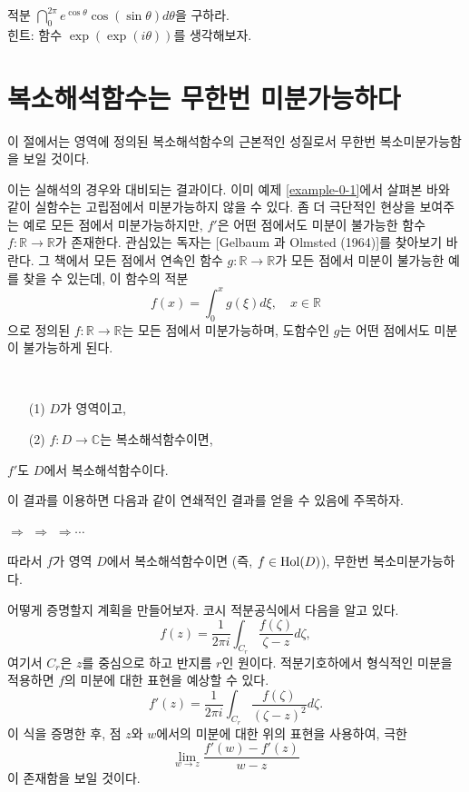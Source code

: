 \begin{salt_exercise} \label{ex-3-28}
적분 $\dint_0^{2\pi} e^{\cos \theta} \cos(\sin\theta)d\theta$을 구하라.\\[1ex]
힌트: 함수 $\exp(\exp(i\theta))$를 생각해보자.
\end{salt_exercise}

\section{복소해석함수는 무한번 미분가능하다}

이 절에서는 영역에 정의된 복소해석함수의 근본적인 성질로서 
무한번 복소미분가능함을 보일 것이다.

이는 실해석의 경우와 대비되는 결과이다.
이미 예제 \ref{example-0-1}에서 살펴본 바와 같이
실함수는 고립점에서 미분가능하지 않을 수 있다.
좀 더 극단적인 현상을 보여주는 예로 
모든 점에서 미분가능하지만, $f'$은 어떤 점에서도 미분이 불가능한 
함수 $f:\mathbb R\to \mathbb R$가 존재한다.
관심있는 독자는 [Gelbaum 과 Olmsted (1964)]를 %
 찾아보기 바란다.
그 책에서 모든 점에서 연속인 함수 $g:\mathbb R\to \mathbb R$가 
모든 점에서 미분이 불가능한 예를 찾을 수 있는데,
이 함수의 적분
\[
f(x) = \int_0^x g(\xi)d\xi, \quad x\in \mathbb R
\]
으로 정의된 $f:\mathbb R\to \mathbb R$는 모든 점에서 미분가능하며,
도함수인 $g$는 어떤 점에서도 미분이 불가능하게 된다.

\begin{salt_corollary} \label{coro-3-6}
\
\begin{itemize}
\item[(1)] $D$가 영역이고,
\item[(2)] $f:D\to\mathbb C$는 복소해석함수이면,
\end{itemize}
$f'$도 $D$에서 복소해석함수이다.
\end{salt_corollary}

이 결과를 이용하면 다음과 같이 연쇄적인 결과를 얻을 수 있음에 주목하자.

\begin{center}
 $\Rightarrow$ 
$\Rightarrow$
$\Rightarrow\cdots$
\end{center}

따라서 $f$가 영역  $D$에서 복소해석함수이면 (즉, $f\in \mathop{\mathrm{Hol}}(D)$),
무한번 복소미분가능하다.

어떻게 증명할지 계획을 만들어보자.
코시 적분공식에서 다음을 알고 있다.
\[
f(z) = \dfrac1{2\pi i} \int_{C_r} \dfrac{f(\zeta)}{\zeta - z} d\zeta,
\]
여기서 $C_r$은 $z$를 중심으로 하고 반지름 $r$인 원이다.
적분기호하에서 형식적인 미분을 적용하면
$f$의 미분에 대한 표현을 예상할 수 있다.
\[
f'(z) = \dfrac1{2\pi i} \int_{C_r} \dfrac{f(\zeta)}{(\zeta - z)^2} d\zeta.
\]
이 식을 증명한 후, 점 $z$와 $w$에서의 미분에 대한 위의 표현을 사용하여, 극한
\[
\lim_{w\to z}\dfrac{f'(w)-f'(z)}{w-z}
\]
이 존재함을 보일 것이다.

